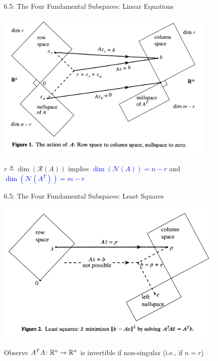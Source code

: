 \documentclass[10pt,letterpaper,english]{beamer}
\begin{document}
\begin{frame}{6.5: The Four Fundamental Subspaces: Linear Equations}

\hspace*{-1mm}
\includegraphics[width=108mm]{figures/strang_fig1.png}

\vspace{-3mm}
$r \triangleq \dim(\mathcal{R}(A))$ implies \textcolor{blue}{$\dim ( \mathcal{N}(A)) = n\!-\!r$} and \textcolor{blue}{$\dim ( \mathcal{N}(A^T)) = m\!-\!r$}

\let\thefootnote\relax\footnotetext{\hspace*{-4mm} {\tiny Figure from ``The Fundamental Theorem of Linear Algebra'' by Gilbert Strang, The American Mathematical Monthly, Nov. 1993 }}

\end{frame}

\begin{frame}{6.5: The Four Fundamental Subspaces: Least Squares}

\hspace*{-4mm}
\includegraphics[width=114mm]{figures/strang_fig2}

Observe $A^T A \colon \mathbb{R}^n \to \mathbb{R}^n$ is invertible if non-singular (i.e., if $n=r$)

\let\thefootnote\relax\footnotetext{\hspace*{-4mm} {\tiny Figure from ``The Fundamental Theorem of Linear Algebra'' by Gilbert Strang, The American Mathematical Monthly, Nov. 1993 }}

\end{frame}
\end{document}
